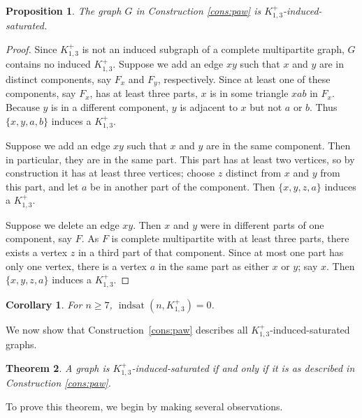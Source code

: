 \documentclass[12pt]{amsart}
\theoremstyle{plain}
\newtheorem{thm}{Theorem}[section]
\newtheorem{prop}[thm]{Proposition}
\newtheorem{cor}{Corollary}[thm]
\theoremstyle{definition}
\theoremstyle{remark}
\newcommand{\indsat}[2]{\ensuremath{\operatorname{indsat}(#1,#2)}\xspace}
\newcommand{\sis}[2]{\ensuremath{{\operatorname{indsat}}^*(#1,#2)}\xspace}
\newcommand{\paw}{\ensuremath{K_{1,3}^+}\xspace}
\begin{document}

\begin{prop}
The graph $G$ in Construction \ref{cons:paw} is \paw-induced-saturated.
\end{prop}
\begin{proof}
Since \paw is not an induced subgraph of a complete multipartite graph, $G$ contains no induced \paw.
Suppose we add an edge $xy$ such that $x$ and $y$ are in distinct components, say $F_x$ and $F_y$, respectively.  Since at least one of these components, say $F_x$, has at least three parts, $x$ is in some triangle $xab$ in $F_x$.
Because $y$ is in a different component, $y$ is adjacent to $x$ but not $a$ or $b$.
Thus $\{x,y,a,b\}$ induces a \paw.

Suppose we add an edge $xy$ such that $x$ and $y$ are in the same component.
Then in particular, they are in the same part.
This part has at least two vertices, so by construction it has at least three vertices; choose $z$ distinct from $x$ and $y$ from this part, and let $a$ be in another part of the component.
Then $\{x,y,z,a\}$ induces a \paw.

Suppose we delete an edge $xy$.
Then $x$ and $y$ were in different parts of one component, say $F$.
As $F$ is complete multipartite with at least three parts, there exists a vertex $z$ in a third part of that component. Since at most one part has only one vertex, there is a vertex $a$ in the same part as either $x$ or $y$; say $x$. Then $\{x,y,z,a\}$ induces a \paw.
\end{proof}

\begin{cor}\label{indsat_paw}
For $n \ge 7$, $\indsat{n}{\paw}=0$.
\end{cor}


We now show that Construction~\ref{cons:paw} describes all \paw-induced-saturated graphs. %

\begin{thm}\label{paw_unique}
A graph is \paw-induced-saturated if and only if it is as described in Construction \ref{cons:paw}.
\end{thm}

To prove this theorem, we begin by making several observations.
\end{document}
